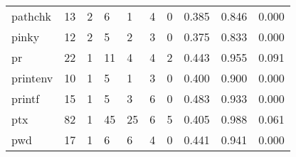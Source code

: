\begin{longtable}{lp{2.0cm}p{2.0cm}p{2.0cm}p{2.0cm}p{2.0cm}p{2.0cm}p{2.0cm}p{2.0cm}p{2.0cm}}
pathchk   &                     13 &                                             2 &                                            6 &                                           1 &                                            4 &                                          0 &                                0.385 &                                  0.846 &                                0.000 \\
pinky     &                     12 &                                             2 &                                            5 &                                           2 &                                            3 &                                          0 &                                0.375 &                                  0.833 &                                0.000 \\
pr        &                     22 &                                             1 &                                           11 &                                           4 &                                            4 &                                          2 &                                0.443 &                                  0.955 &                                0.091 \\
printenv  &                     10 &                                             1 &                                            5 &                                           1 &                                            3 &                                          0 &                                0.400 &                                  0.900 &                                0.000 \\
printf    &                     15 &                                             1 &                                            5 &                                           3 &                                            6 &                                          0 &                                0.483 &                                  0.933 &                                0.000 \\
ptx       &                     82 &                                             1 &                                           45 &                                          25 &                                            6 &                                          5 &                                0.405 &                                  0.988 &                                0.061 \\
pwd       &                     17 &                                             1 &                                            6 &                                           6 &                                            4 &                                          0 &                                0.441 &                                  0.941 &                                0.000 \\

\end{longtable}
